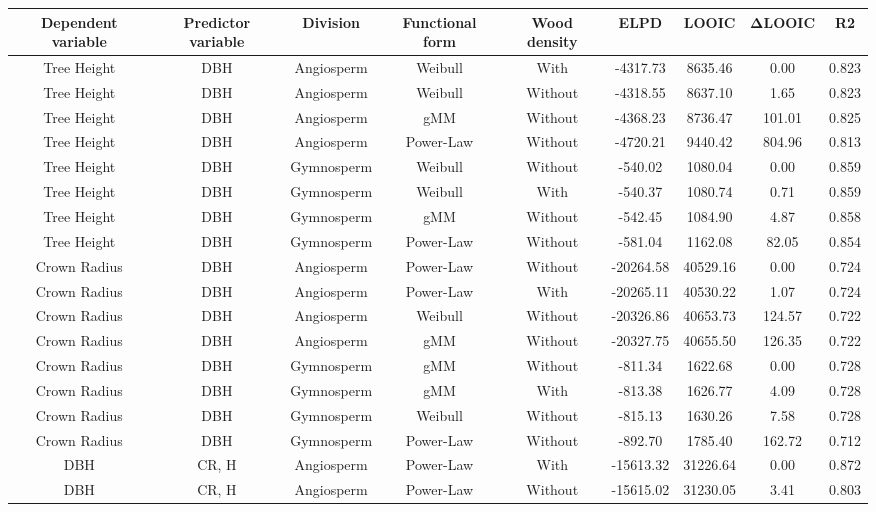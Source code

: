 \documentclass[
  12pt,
  letterpaper,
  DIV=11,
  numbers=noendperiod]{scrartcl}
\begin{document}
\begin{longtable*}[t]{ccccccccc}
\toprule
Dependent variable & Predictor variable & Division & Functional form & Wood density & ELPD & LOOIC & ΔLOOIC & R2\\
\midrule
Tree Height & DBH & Angiosperm & Weibull & With & -4317.73 & 8635.46 & 0.00 & 0.823\\
Tree Height & DBH & Angiosperm & Weibull & Without & -4318.55 & 8637.10 & 1.65 & 0.823\\
Tree Height & DBH & Angiosperm & gMM & Without & -4368.23 & 8736.47 & 101.01 & 0.825\\
Tree Height & DBH & Angiosperm & Power-Law & Without & -4720.21 & 9440.42 & 804.96 & 0.813\\
Tree Height & DBH & Gymnosperm & Weibull & Without & -540.02 & 1080.04 & 0.00 & 0.859\\
\addlinespace
Tree Height & DBH & Gymnosperm & Weibull & With & -540.37 & 1080.74 & 0.71 & 0.859\\
Tree Height & DBH & Gymnosperm & gMM & Without & -542.45 & 1084.90 & 4.87 & 0.858\\
Tree Height & DBH & Gymnosperm & Power-Law & Without & -581.04 & 1162.08 & 82.05 & 0.854\\
Crown Radius & DBH & Angiosperm & Power-Law & Without & -20264.58 & 40529.16 & 0.00 & 0.724\\
Crown Radius & DBH & Angiosperm & Power-Law & With & -20265.11 & 40530.22 & 1.07 & 0.724\\
\addlinespace
Crown Radius & DBH & Angiosperm & Weibull & Without & -20326.86 & 40653.73 & 124.57 & 0.722\\
Crown Radius & DBH & Angiosperm & gMM & Without & -20327.75 & 40655.50 & 126.35 & 0.722\\
Crown Radius & DBH & Gymnosperm & gMM & Without & -811.34 & 1622.68 & 0.00 & 0.728\\
Crown Radius & DBH & Gymnosperm & gMM & With & -813.38 & 1626.77 & 4.09 & 0.728\\
Crown Radius & DBH & Gymnosperm & Weibull & Without & -815.13 & 1630.26 & 7.58 & 0.728\\
\addlinespace
Crown Radius & DBH & Gymnosperm & Power-Law & Without & -892.70 & 1785.40 & 162.72 & 0.712\\
DBH & CR, H & Angiosperm & Power-Law & With & -15613.32 & 31226.64 & 0.00 & 0.872\\
DBH & CR, H & Angiosperm & Power-Law & Without & -15615.02 & 31230.05 & 3.41 & 0.803\\

\end{longtable*}
\end{document}
